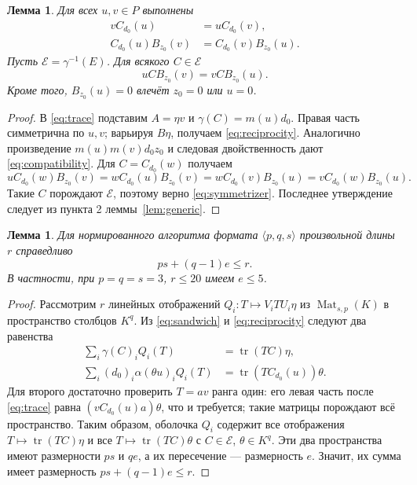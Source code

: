 \documentclass[11pt,a4paper]{article}
\numberwithin{equation}{section}
\theoremstyle{plain}
\newtheorem{lemma}[theorem]{Лемма}
\theoremstyle{definition}
\DeclareMathOperator{\tr}{tr}\DeclareMathOperator{\rk}{rk}
\DeclareMathOperator{\Mat}{Mat}\DeclareMathOperator{\Span}{span}
\newcommand{\E}{\mathcal E}\newcommand{\Sig}{\Sigma}
\newcommand{\leqs}{\leqslant}\newcommand{\geqs}{\geqslant}
\begin{document}
\begin{lemma}\label{lem:reciprocity}
Для всех $u,v\in P$ выполнены
\begin{align}
 vC_{d_0}(u)&=uC_{d_0}(v),\label{eq:reciprocity}\\
 C_{d_0}(u)B_{z_0}(v)&=C_{d_0}(v)B_{z_0}(u).\label{eq:compatibility}
\end{align}
Пусть $\E=\gamma^{-1}(E)$. Для всякого $C\in\E$
\begin{equation}\label{eq:symmetrizer}
 uCB_{z_0}(v)=vCB_{z_0}(u).
\end{equation}
Кроме того, $B_{z_0}(u)=0$ влечёт $z_0=0$ или $u=0$.
\end{lemma}
\begin{proof}
В \eqref{eq:trace} подставим $A=\eta v$ и
$\gamma(C)=m(u)d_0$. Правая часть симметрична по $u,v$;
варьируя $B\eta$, получаем \eqref{eq:reciprocity}.
Аналогично произведение $m(u)m(v)d_0z_0$ и следовая двойственность
дают \eqref{eq:compatibility}. Для $C=C_{d_0}(w)$ получаем
\[
 uC_{d_0}(w)B_{z_0}(v)
 =wC_{d_0}(u)B_{z_0}(v)
 =wC_{d_0}(v)B_{z_0}(u)
 =vC_{d_0}(w)B_{z_0}(u).
\]
Такие $C$ порождают $\E$, поэтому верно \eqref{eq:symmetrizer}.
Последнее утверждение следует из пункта 2 леммы~\ref{lem:generic}.
\end{proof}

\begin{lemma}\label{lem:physical-bound}
Для нормированного алгоритма формата $\langle p,q,s\rangle$
произвольной длины $r$ справедливо
\[
 ps+(q-1)e\leqs r.
\]
В частности, при $p=q=s=3$, $r\leqs20$ имеем $e\leqs5$.
\end{lemma}
\begin{proof}
Рассмотрим $r$ линейных отображений
$Q_i:T\mapsto V_iTU_i\eta$ из $\Mat_{s,p}(K)$ в пространство столбцов $K^q$.
Из \eqref{eq:sandwich} и \eqref{eq:reciprocity} следуют два равенства
\begin{align*}
 \sum_i\gamma(C)_iQ_i(T)&=\tr(TC)\eta,\\
 \sum_i(d_0)_i\alpha(\theta u)_iQ_i(T)
       &=\tr(TC_{d_0}(u))\theta.
\end{align*}
Для второго достаточно проверить $T=av$ ранга один: его левая часть
после \eqref{eq:trace} равна
$(vC_{d_0}(u)a)\theta$, что и требуется; такие матрицы порождают всё
пространство. Таким образом, оболочка $Q_i$ содержит все отображения
$T\mapsto\tr(TC)\eta$ и все $T\mapsto\tr(TC)\theta$ с $C\in\E$,
$\theta\in K^q$. Эти два пространства имеют размерности $ps$ и $qe$,
а их пересечение --- размерность $e$. Значит, их сумма имеет размерность
$ps+(q-1)e\leqs r$.
\end{proof}
\end{document}
